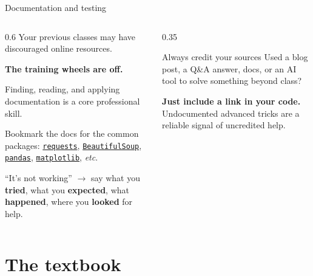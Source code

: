 \documentclass[9pt,aspectratio=169]{beamer}
\begin{document}
\begin{frame}{Documentation and testing}
    \begin{columns}[T]
        \begin{column}{0.6\textwidth}
            Your previous classes may have discouraged online resources.

            \bigskip
            \textbf{The training wheels are off.}

            \bigskip
            Finding, reading, and applying documentation is a core professional skill.

            \bigskip
            Bookmark the docs for the common packages: \href{https://requests.readthedocs.io/en/stable/}{\texttt{requests}}, \href{https://beautiful-soup-4.readthedocs.io/en/latest/}{\texttt{BeautifulSoup}}, \href{https://pandas.pydata.org/}{\texttt{pandas}}, \href{https://matplotlib.org/}{\texttt{matplotlib}}, \textit{etc}.

            \bigskip
            ``It's not working'' $\rightarrow$ say what you \textbf{tried}, what you \textbf{expected}, what \textbf{happened}, where you \textbf{looked} for help.
        \end{column}
        \begin{column}{0.35\textwidth}
            \begin{block}{Always credit your sources}
                \footnotesize Used a blog post, a Q\&A answer, docs, or an AI tool to solve something beyond class?
                \smallskip

                \textbf{Just include a link in your code.} Undocumented advanced tricks are a reliable signal of uncredited help.
            \end{block}
        \end{column}
    \end{columns}
\end{frame}

\section{The textbook}
\end{document}
